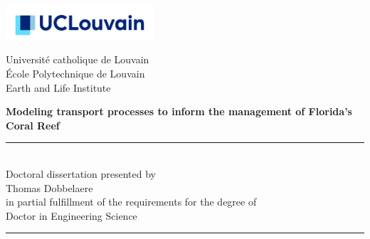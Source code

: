 \thispagestyle{empty}
\begin{minipage}[b]{0.3\textwidth}
\hspace*{-0.8cm}\includegraphics[width=5.5cm]{./figures/logo_ucl.jpg}\vspace{0.35cm}
\end{minipage}
\begin{minipage}[b]{0.69\textwidth}
	\begin{center}
	\hspace*{0.5cm}Université catholique de Louvain\\
	\hspace*{0.5cm}\'Ecole Polytechnique de Louvain\\
	\hspace*{0.5cm} Earth and Life Institute\\
	\end{center}
\end{minipage}


\vspace*{3cm}
\hspace{-0.8cm}
\begin{minipage}{1.02\linewidth}
\centering
\LARGE\bfseries Modeling transport processes to inform the management of Florida's Coral Reef %
\end{minipage}


\vspace*{0.5cm}
\hspace{-0.5cm}\begin{minipage}{\textwidth}
\centering
\rule{50pt}{.5pt}\\[1.2ex]
Doctoral dissertation presented by \\ [2.ex]
{\Large Thomas Dobbelaere\\ [2.ex]
}
in partial fulfillment of the requirements for the degree of\\ [2.ex]
\Large Doctor in Engineering Science

\rule{50pt}{.5pt}\\
\end{minipage}

